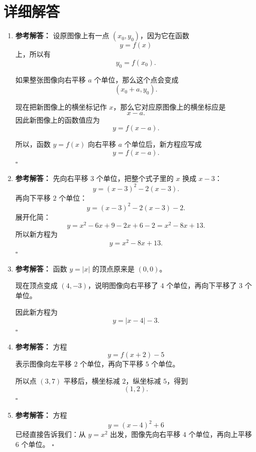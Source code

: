 \documentclass[11pt,a4paper,fontset=fandol]{ctexart}
\newenvironment{solution}{\par\noindent\textbf{参考解答：}}{\hfill$\square$\par}
\begin{document}
\newpage
\section{详细解答}

\begin{enumerate}
  \item \begin{solution}
  设原图像上有一点 $(x_0,y_0)$，因为它在函数
  \[
  y=f(x)
  \]
  上，所以有
  \[
  y_0=f(x_0).
  \]

  如果整张图像向右平移 $a$ 个单位，那么这个点会变成
  \[
  (x_0+a,y_0).
  \]

  现在把新图像上的横坐标记作 $x$，那么它对应原图像上的横坐标应是
  \[
  x-a.
  \]
  因此新图像上的函数值应为
  \[
  y=f(x-a).
  \]

  所以，函数 $y=f(x)$ 向右平移 $a$ 个单位后，新方程应写成
  \[
  \boxed{y=f(x-a)}.
  \]
  \end{solution}

  \item \begin{solution}
  先向右平移 $3$ 个单位，把整个式子里的 $x$ 换成 $x-3$：
  \[
  y=(x-3)^2-2(x-3).
  \]
  再向下平移 $2$ 个单位：
  \[
  y=(x-3)^2-2(x-3)-2.
  \]
  展开化简：
  \[
  y=x^2-6x+9-2x+6-2=x^2-8x+13.
  \]
  所以新方程为
  \[
  \boxed{y=x^2-8x+13}.
  \]
  \end{solution}

  \item \begin{solution}
  函数 $y=|x|$ 的顶点原来是 $(0,0)$。

  现在顶点变成 $(4,-3)$，说明图像向右平移了 $4$ 个单位，再向下平移了 $3$ 个单位。

  因此新方程为
  \[
  \boxed{y=|x-4|-3}.
  \]
  \end{solution}

  \item \begin{solution}
  方程
  \[
  y=f(x+2)-5
  \]
  表示图像向左平移 $2$ 个单位，再向下平移 $5$ 个单位。

  所以点 $(3,7)$ 平移后，横坐标减 $2$，纵坐标减 $5$，得到
  \[
  \boxed{(1,2)}.
  \]
  \end{solution}

  \item \begin{solution}
  方程
  \[
  y=(x-4)^2+6
  \]
  已经直接告诉我们：从 $y=x^2$ 出发，图像先向右平移 $4$ 个单位，再向上平移 $6$ 个单位。
  \end{solution}


\end{enumerate}
\end{document}
